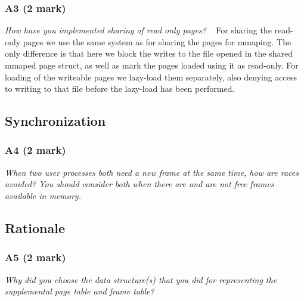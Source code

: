 \documentclass{report}
\newcommand{\question}[1]{\textit{#1} \ }
\begin{document}
			\subsubsection*{A3 (2 mark)}
				\question{How have you implemented sharing of read only pages?}
				For sharing the read-only pages we use the same system as for
				sharing the pages for mmaping. The only difference is that
				here we block the writes to the file opened in the shared mmaped
				page struct, as well as mark the pages loaded using it as
				read-only. For loading of the writeable pages we lazy-load
				them separately, also denying access to writing to that file
				before the lazy-load has been performed.
			
		\subsection*{Synchronization}
			\subsubsection*{A4 (2 mark)}
				\question{When two user processes both need a new frame at 
				the same time, how are races avoided? You should consider both 
				when there are and are not free frames available in memory.}
				
			
		\subsection*{Rationale}
			\subsubsection*{A5 (2 mark)}
				\question{Why did you choose the data structure(s) that you did for 
				representing the supplemental page table and frame table?}
\end{document}
